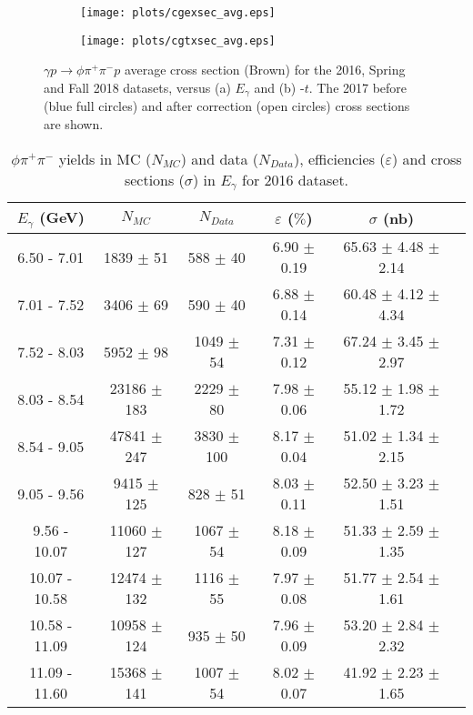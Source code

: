 \begin{center}
    \null
    \vfill
\begin{figure}[H]
    \centering
    \begin{subfigure}[b]{0.5\textwidth}
        \texttt{[image: plots/cgexsec\_avg.eps]}
        \caption{}
        \label{fig.y2175.xsec_ul.phi2pi.11.a}
    \end{subfigure}\hfill
    \begin{subfigure}[b]{0.5\textwidth}
        \texttt{[image: plots/cgtxsec\_avg.eps]}
        \caption{}
        \label{fig.y2175.xsec_ul.phi2pi.11.b}
    \end{subfigure}
    \caption{\label{fig.y2175.xsec_ul.phi2pi.11}$\gamma p \rightarrow \phi \pi^{+} \pi^{-} p$ average cross section (Brown) for the 2016, Spring and Fall 2018 datasets, versus (a) $E_{\gamma}$ and (b) -$t$. The 2017 before (blue full circles) and after correction (open circles) cross sections are shown.}
\end{figure}
\end{center}

\begin{center}
\begin{table}[h]
    \caption{$\phi \pi^{+}\pi^{-}$ yields in MC ($N_{MC}$) and data ($N_{Data}$), efficiencies ($\varepsilon$) and cross sections ($\sigma$) in $E_{\gamma}$ for 2016 dataset.}
    \label{tab.y2175.xsec_ul.phi2pi.1.1}
    \begin{tabular}{|c|c|c|c|c|c|}
    \hline
    $E_{\gamma}$ (GeV) & $N_{MC}$ & $N_{Data}$ & $\varepsilon$ ($\%$) & $\sigma$ (nb) \\ 
    \hline
   6.50 - 7.01 & 1839 $\pm$ 51 & 588 $\pm$ 40 & 6.90 $\pm$ 0.19 & 65.63 $\pm$ 4.48 $\pm$ 2.14 \\ 
   7.01 - 7.52 & 3406 $\pm$ 69 & 590 $\pm$ 40 & 6.88 $\pm$ 0.14 & 60.48 $\pm$ 4.12 $\pm$ 4.34 \\ 
   7.52 - 8.03 & 5952 $\pm$ 98 & 1049 $\pm$ 54 & 7.31 $\pm$ 0.12 & 67.24 $\pm$ 3.45 $\pm$ 2.97 \\ 
   8.03 - 8.54 & 23186 $\pm$ 183 & 2229 $\pm$ 80 & 7.98 $\pm$ 0.06 & 55.12 $\pm$ 1.98 $\pm$ 1.72 \\ 
   8.54 - 9.05 & 47841 $\pm$ 247 & 3830 $\pm$ 100 & 8.17 $\pm$ 0.04 & 51.02 $\pm$ 1.34 $\pm$ 2.15 \\ 
   9.05 - 9.56 & 9415 $\pm$ 125 & 828 $\pm$ 51 & 8.03 $\pm$ 0.11 & 52.50 $\pm$ 3.23 $\pm$ 1.51 \\ 
   9.56 - 10.07 & 11060 $\pm$ 127 & 1067 $\pm$ 54 & 8.18 $\pm$ 0.09 & 51.33 $\pm$ 2.59 $\pm$ 1.35 \\ 
   10.07 - 10.58 & 12474 $\pm$ 132 & 1116 $\pm$ 55 & 7.97 $\pm$ 0.08 & 51.77 $\pm$ 2.54 $\pm$ 1.61 \\ 
   10.58 - 11.09 & 10958 $\pm$ 124 & 935 $\pm$ 50 & 7.96 $\pm$ 0.09 & 53.20 $\pm$ 2.84 $\pm$ 2.32 \\ 
   11.09 - 11.60 & 15368 $\pm$ 141 & 1007 $\pm$ 54 & 8.02 $\pm$ 0.07 & 41.92 $\pm$ 2.23 $\pm$ 1.65 \\ 
   \hline
\end{tabular}
\end{table}
\null
\vfill
\end{center}

